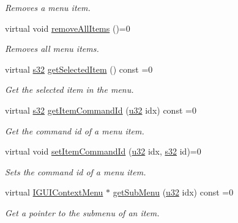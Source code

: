 \begin{DoxyCompactItemize}
\begin{DoxyCompactList}\small\item\em Removes a menu item. \end{DoxyCompactList}\item 
\mbox{\label{classirr_1_1gui_1_1IGUIContextMenu_ac06b8d80fb076c6bed3aef2a17fb01f9}} 
virtual void \hyperlink{classirr_1_1gui_1_1IGUIContextMenu_ac06b8d80fb076c6bed3aef2a17fb01f9}{remove\+All\+Items} ()=0
\begin{DoxyCompactList}\small\item\em Removes all menu items. \end{DoxyCompactList}\item 
virtual \hyperlink{namespaceirr_ac66849b7a6ed16e30ebede579f9b47c6}{s32} \hyperlink{classirr_1_1gui_1_1IGUIContextMenu_ae6cd391cf56d4454a855e19feddf8fdc}{get\+Selected\+Item} () const =0
\begin{DoxyCompactList}\small\item\em Get the selected item in the menu. \end{DoxyCompactList}\item 
virtual \hyperlink{namespaceirr_ac66849b7a6ed16e30ebede579f9b47c6}{s32} \hyperlink{classirr_1_1gui_1_1IGUIContextMenu_a5edfede62ed558acd68b06eeea0682c3}{get\+Item\+Command\+Id} (\hyperlink{namespaceirr_a0416a53257075833e7002efd0a18e804}{u32} idx) const =0
\begin{DoxyCompactList}\small\item\em Get the command id of a menu item. \end{DoxyCompactList}\item 
virtual void \hyperlink{classirr_1_1gui_1_1IGUIContextMenu_a1380ff56d8c4c5b8de8d221062464654}{set\+Item\+Command\+Id} (\hyperlink{namespaceirr_a0416a53257075833e7002efd0a18e804}{u32} idx, \hyperlink{namespaceirr_ac66849b7a6ed16e30ebede579f9b47c6}{s32} id)=0
\begin{DoxyCompactList}\small\item\em Sets the command id of a menu item. \end{DoxyCompactList}\item 
virtual \hyperlink{classirr_1_1gui_1_1IGUIContextMenu}{I\+G\+U\+I\+Context\+Menu} $\ast$ \hyperlink{classirr_1_1gui_1_1IGUIContextMenu_a296cfd0c4944b2c0bfb88973401fb824}{get\+Sub\+Menu} (\hyperlink{namespaceirr_a0416a53257075833e7002efd0a18e804}{u32} idx) const =0
\begin{DoxyCompactList}\small\item\em Get a pointer to the submenu of an item. \end{DoxyCompactList}\item 

\end{DoxyCompactItemize}

